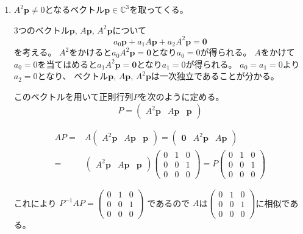 \documentclass[12pt,b5paper]{ltjsarticle}
\begin{document}
\begin{enumerate}
 \item
      $A^2\bm{p}\ne 0$となるベクトル$\bm{p}\in\mathbb{C}^3$を取ってくる。

      3つのベクトル$\bm{p},\,A\bm{p},\,A^2\bm{p}$について
      \begin{equation}
       a_0\bm{p} + a_1A\bm{p} + a_2A^2\bm{p} = \bm{0}
      \end{equation}
      を考える。
      $A^2$をかけると$a_0A^2\bm{p}=\bm{0}$となり$a_0=0$が得られる。
      $A$をかけて$a_0=0$を当てはめると$a_1A^2\bm{p}=\bm{0}$となり$a_1=0$が得られる。
      $a_0=a_1=0$より$a_2=0$となり、
      ベクトル$\bm{p},\,A\bm{p},\,A^2\bm{p}$は一次独立であることが分かる。

      このベクトルを用いて正則行列$P$を次のように定める。
      \begin{equation}
       P = \begin{pmatrix} A^2\bm{p} & A\bm{p} & \bm{p} \end{pmatrix}
      \end{equation}

      \begin{align}
       AP =& A \begin{pmatrix} A^2\bm{p} & A\bm{p} & \bm{p} \end{pmatrix}
       = \begin{pmatrix} \bm{0} & A^2\bm{p} & A\bm{p} \end{pmatrix}\\
       =& \begin{pmatrix} A^2\bm{p} & A\bm{p} & \bm{p} \end{pmatrix}
       \begin{pmatrix} 0 & 1 & 0 \\ 0 & 0 & 1 \\ 0 & 0 & 0 \end{pmatrix}
       = P \begin{pmatrix} 0 & 1 & 0 \\ 0 & 0 & 1 \\ 0 & 0 & 0 \end{pmatrix}
      \end{align}

      これにより
      $P^{-1}AP=\begin{pmatrix} 0 & 1 & 0 \\ 0 & 0 & 1 \\ 0 & 0 & 0 \end{pmatrix}$
      であるので
      $A$は$\begin{pmatrix} 0 & 1 & 0 \\ 0 & 0 & 1 \\ 0 & 0 & 0 \end{pmatrix}$に相似である。


\end{enumerate}

\hrulefill
\end{document}
